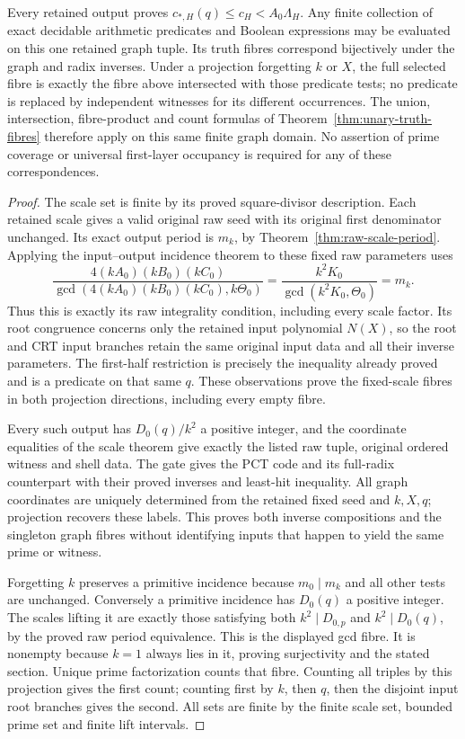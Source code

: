 \begin{theorem}
Every retained output proves
\(c_{*,H}(q)\le c_H<A_0\Lambda_H\).
Any finite collection of exact decidable arithmetic predicates
and Boolean expressions may be evaluated on this one retained
graph tuple.  Its truth fibres correspond bijectively under the
graph and radix inverses.  Under a projection forgetting
\(k\) or \(X\), the full selected fibre is exactly the fibre
above intersected with those predicate tests; no predicate is
replaced by independent witnesses for its different occurrences.
The union, intersection, fibre-product and count formulas of
Theorem~\ref{thm:unary-truth-fibres} therefore apply on this same
finite graph domain.  No assertion of prime coverage or universal
first-layer occupancy is required for any of these correspondences.
\end{theorem}
\begin{proof}
The scale set is finite by its proved square-divisor description.
Each retained scale gives a valid original raw seed with its
original first denominator unchanged.  Its exact output period is
\(m_k\), by Theorem~\ref{thm:raw-scale-period}.
Applying the input--output incidence theorem to these fixed raw
parameters uses
\[
 \frac{4(kA_0)(kB_0)(kC_0)}
      {\gcd(4(kA_0)(kB_0)(kC_0),k\Theta_0)}
 =\frac{k^2K_0}{\gcd(k^2K_0,\Theta_0)}=m_k.
\]
Thus this is exactly its raw integrality condition, including every
scale factor.  Its root congruence concerns only the retained input
polynomial \(N(X)\), so the root and CRT input branches retain
the same original input data and all their inverse parameters.
The first-half restriction is precisely the inequality already
proved and is a predicate on that same \(q\).
These observations prove the fixed-scale fibres in both projection
directions, including every empty fibre.

Every such output has \(D_0(q)/k^2\) a positive integer,
and the coordinate equalities of the scale theorem give exactly
the listed raw tuple, original ordered witness and shell data.
The gate gives the PCT code and its full-radix counterpart with
their proved inverses and least-hit inequality.
All graph coordinates are uniquely determined from the retained
fixed seed and \(k,X,q\); projection recovers these labels.
This proves both inverse compositions and the singleton graph
fibres without identifying inputs that happen to yield the same
prime or witness.

Forgetting \(k\) preserves a primitive incidence because
\(m_0\mid m_k\) and all other tests are unchanged.
Conversely a primitive incidence has \(D_0(q)\) a positive
integer.  The scales lifting it are exactly those satisfying both
\(k^2\mid D_{0,p}\) and \(k^2\mid D_0(q)\), by the proved
raw period equivalence.  This is the displayed gcd fibre.
It is nonempty because \(k=1\) always lies in it, proving
surjectivity and the stated section.  Unique prime factorization
counts that fibre.  Counting all triples by this projection gives
the first count; counting first by \(k\), then \(q\), then the
disjoint input root branches gives the second.  All sets are finite
by the finite scale set, bounded prime set and finite lift intervals.


\end{proof}

